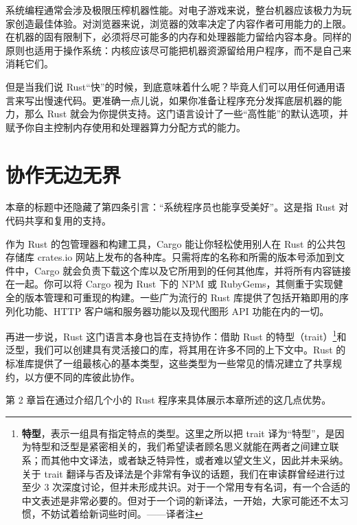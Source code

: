 系统编程通常会涉及极限压榨机器性能。对电子游戏来说，整台机器应该极力为玩家创造最佳体验。对浏览器来说，浏览器的效率决定了内容作者可用能力的上限。在机器的固有限制下，必须将尽可能多的内存和处理器能力留给内容本身。同样的原则也适用于操作系统：内核应该尽可能把机器资源留给用户程序，而不是自己来消耗它们。

但是当我们说 Rust“快”的时候，到底意味着什么呢？毕竟人们可以用任何通用语言来写出慢速代码。更准确一点儿说，如果你准备让程序充分发挥底层机器的能力，那么 Rust 就会为你提供支持。这门语言设计了一些“高性能”的默认选项，并赋予你自主控制内存使用和处理器算力分配方式的能力。

\section{协作无边无界}

本章的标题中还隐藏了第四条引言：“系统程序员也能享受美好”。这是指 Rust 对代码共享和复用的支持。

作为 Rust 的包管理器和构建工具，Cargo 能让你轻松使用别人在 Rust 的公共包存储库 crates.io 网站上发布的各种库。只需将库的名称和所需的版本号添加到文件中，Cargo 就会负责下载这个库以及它所用到的任何其他库，并将所有内容链接在一起。你可以将 Cargo 视为 Rust 下的 NPM 或 RubyGems，其侧重于实现健全的版本管理和可重现的构建。一些广为流行的 Rust 库提供了包括开箱即用的序列化功能、HTTP 客户端和服务器功能以及现代图形 API 功能在内的一切。

再进一步说，Rust 这门语言本身也旨在支持协作：借助 Rust 的特型（trait）\footnote{\textbf{特型}，表示一组具有指定特点的类型。这里之所以把 trait 译为“特型”，是因为特型和泛型是紧密相关的，我们希望读者顾名思义就能在两者之间建立联系；而其他中文译法，或者缺乏特异性，或者难以望文生义，因此并未采纳。关于 trait 翻译与否及译法是个非常有争议的话题，我们在审读群曾经进行过至少 3 次深度讨论，但并未形成共识。对于一个常用专有名词，有一个合适的中文表述是非常必要的。但对于一个词的新译法，一开始，大家可能还不太习惯，不妨试着给新词些时间。——译者注}和泛型，我们可以创建具有灵活接口的库，将其用在许多不同的上下文中。Rust 的标准库提供了一组最核心的基本类型，这些类型为一些常见的情况建立了共享规约，以方便不同的库彼此协作。

第 2 章旨在通过介绍几个小的 Rust 程序来具体展示本章所述的这几点优势。

